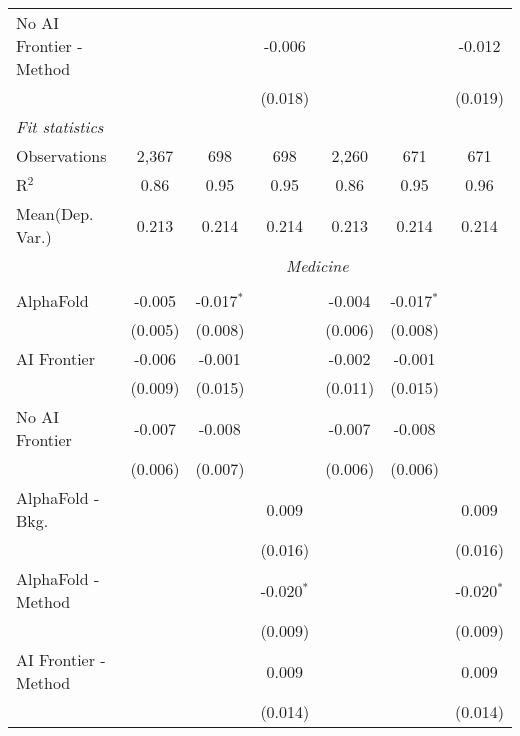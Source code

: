 \begin{tabular}{lcccccc}
   No AI Frontier - Method &             &                & -0.006         &             &                & -0.012\\   
                           &             &                & (0.018)        &             &                & (0.019)\\   
   \midrule
   \emph{Fit statistics}\\
   Observations            & 2,367       & 698            & 698            & 2,260       & 671            & 671\\  
   R$^2$                   & 0.86        & 0.95           & 0.95           & 0.86        & 0.95           & 0.96\\  
   
Mean(Dep. Var.) & 0.213 & 0.214 & 0.214 & 0.213 & 0.214 & 0.214 \\
 & \multicolumn{6}{c}{\textit{Medicine}} \\ \\
   AlphaFold               & -0.005  & -0.017$^{*}$ &              & -0.004  & -0.017$^{*}$ &   \\   
                           & (0.005) & (0.008)      &              & (0.006) & (0.008)      &   \\   
   AI Frontier             & -0.006  & -0.001       &              & -0.002  & -0.001       &   \\   
                           & (0.009) & (0.015)      &              & (0.011) & (0.015)      &   \\   
   No AI Frontier          & -0.007  & -0.008       &              & -0.007  & -0.008       &   \\   
                           & (0.006) & (0.007)      &              & (0.006) & (0.006)      &   \\   
   AlphaFold - Bkg.        &         &              & 0.009        &         &              & 0.009\\   
                           &         &              & (0.016)      &         &              & (0.016)\\   
   AlphaFold - Method      &         &              & -0.020$^{*}$ &         &              & -0.020$^{*}$\\   
                           &         &              & (0.009)      &         &              & (0.009)\\   
   AI Frontier - Method    &         &              & 0.009        &         &              & 0.009\\   
                           &         &              & (0.014)      &         &              & (0.014)\\   

\end{tabular}
